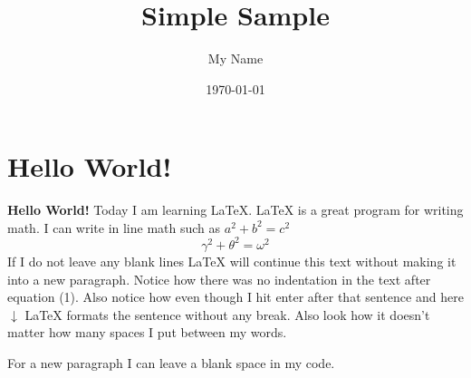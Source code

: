 \documentclass{article}
\title{Simple Sample}
\author{My Name}
\date{\today}
\begin{document}
    \maketitle

    \section{Hello World!}

    \textbf{Hello World!} Today I am learning \LaTeX.
    \LaTeX{} is a great program for writing math. I can write in line math such as $a^2+b^2=c^2$
    \begin{equation}
    \gamma^2+\theta^2=\omega^2
    \end{equation}
    If I do not leave any blank lines \LaTeX{} will continue  this text without making it into a new paragraph.  Notice how there was no indentation in the text after equation (1).
    Also notice how even though I hit enter after that sentence and here $\downarrow$
    \LaTeX{} formats the sentence without any break.  Also   look  how      it   doesn't     matter          how    many  spaces     I put     between       my    words.

    For a new paragraph I can leave a blank space in my code.
\end{document}
